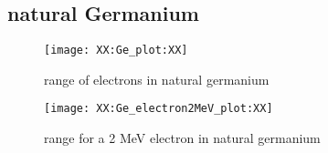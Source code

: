 \subsection{natural Germanium}

\begin{figure}[h]
\centering
	\texttt{[image: XX:Ge\_plot:XX]}
	\caption[Ge interaction]{range of electrons in natural germanium}
	\label{fig:Geelectronplot}
\end{figure}

\begin{figure}[h]
\centering
	\texttt{[image: XX:Ge\_electron2MeV\_plot:XX]}
	\caption[Ge interaction 2 MeV]{range for a 2 MeV electron in natural germanium}
	\label{fig:Geelectron2MeVplot}
\end{figure}

